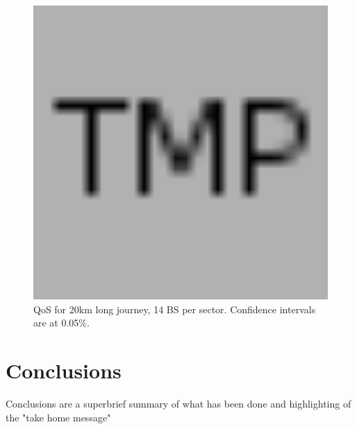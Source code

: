 \documentclass[conference,10pt]{IEEEtran}
\begin{document}
\begin{figure}
	\label{fig:QoS_20km}
	\centering
	\includegraphics[width=12cm]{placeholder.png}
	\caption{QoS for 20km long journey, 14 BS per sector. Confidence intervals are at 0.05\%.}
\end{figure}

\section{Conclusions}\label{sec:conclusion}
Conclusions are a superbrief summary of what has been done and highlighting of the "take home message"
\end{document}
